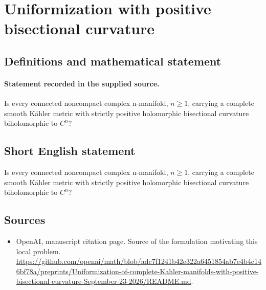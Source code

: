 \documentclass[11pt]{article}
\begin{document}
\section*{Uniformization with positive bisectional curvature}\label{statement}
\subsection{Definitions and mathematical statement}
\paragraph{Statement recorded in the supplied source.}
Is every connected noncompact complex n-manifold, $n\geq 1$, carrying a complete smooth Kähler metric with strictly positive holomorphic bisectional curvature biholomorphic to $C^{n}$?
\subsection{Short English statement}
Is every connected noncompact complex n-manifold, $n\geq 1$, carrying a complete smooth Kähler metric with strictly positive holomorphic bisectional curvature biholomorphic to $C^{n}$?
\subsection{Sources}
\begin{itemize}
\item[S1] OpenAI, manuscript citation page. Source of the formulation motivating this local problem.
\url{https://github.com/openai/math/blob/adc7f1241b42e322a6451854ab7e4b4c146bf78a/preprints/Uniformization-of-complete-Kahler-manifolds-with-positive-bisectional-curvature-September-23-2026/README.md}.
\end{itemize}
\end{document}
